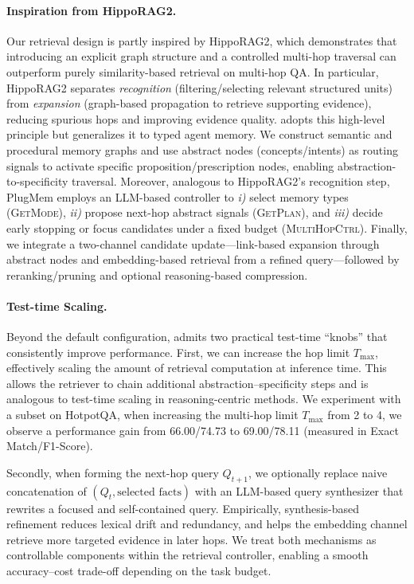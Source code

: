 \paragraph{Inspiration from HippoRAG2.}
Our retrieval design is partly inspired by HippoRAG2, which demonstrates that introducing an explicit graph structure and a controlled multi-hop traversal can outperform purely similarity-based retrieval on multi-hop QA.
In particular, HippoRAG2 separates \emph{recognition} (filtering/selecting relevant structured units) from \emph{expansion} (graph-based propagation to retrieve supporting evidence), reducing spurious hops and improving evidence quality.
\plugmem adopts this high-level principle but generalizes it to typed agent memory.
We construct semantic and procedural memory graphs and use abstract nodes (concepts/intents) as routing signals to activate specific proposition/prescription nodes, enabling abstraction-to-specificity traversal.
Moreover, analogous to HippoRAG2's recognition step, PlugMem employs an LLM-based controller to \textit{i)} select memory types (\textsc{GetMode}), \textit{ii)} propose next-hop abstract signals (\textsc{GetPlan}), and \textit{iii)} decide early stopping or focus candidates under a fixed budget (\textsc{MultiHopCtrl}).
Finally, we integrate a two-channel candidate update---link-based expansion through abstract nodes and embedding-based retrieval from a refined query---followed by reranking/pruning and optional reasoning-based compression. 

\paragraph{Test-time Scaling. }
Beyond the default configuration, \plugmem admits two practical test-time ``knobs'' that consistently improve performance.
First, we can increase the hop limit $T_{\max}$, effectively scaling the amount of retrieval computation at inference time.
This allows the retriever to chain additional abstraction--specificity steps and is analogous to test-time scaling in reasoning-centric methods. We experiment with a subset on HotpotQA, when increasing the multi-hop limit $T_{\max}$ from 2 to 4, we observe a performance gain from 66.00/74.73 to 69.00/78.11 (measured in Exact Match/F1-Score).


Secondly, when forming the next-hop query $Q_{t+1}$, we optionally replace naive concatenation of $(Q_t, \text{selected facts})$ with an LLM-based query synthesizer that rewrites a focused and self-contained query. Empirically, synthesis-based refinement reduces lexical drift and redundancy, and helps the embedding channel retrieve more targeted evidence in later hops.
We treat both mechanisms as controllable components within the retrieval controller, enabling a smooth accuracy--cost trade-off depending on the task budget.


